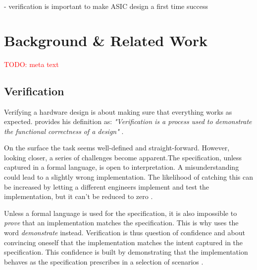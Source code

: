 \documentclass[11pt]{report}
\newcommand{\todo}[1]{\textcolor{red}{TODO: #1}}
\begin{document}
- verification is important to make ASIC design a first time success \cite[Ch. 3]{bergeron2012writing}

\chapter{Background \& Related Work} %

\todo{meta text}

\begin{comment}
- what is the purpose of verification
- what tools do we have to ease verification
- what tools do we have to measure verification progress
- don't introduce "things" but introduce the problems/challenges they're trying to solve

- in this section a complete picture of what verification includes should be drawn in order to put the foundation for
understanding what a verification framework should provide

- to understand current state of verification, we need to look at general approaches, the langauges and their
features, frameworks, as well as methodologies
\end{comment}


\section{Verification} %

Verifying a hardware design is about making sure that everything works as expected. \citeauthor{bergeron2012writing}
provides his definition as: \textit{"Verification is a process used to demonstrate the functional correctness of a
design"} \cite[Ch. 1]{bergeron2012writing}.

On the surface the task seems well-defined and straight-forward. However, looking closer, a series of challenges
become apparent.The specification, unless captured in a formal language, is open to interpretation. A
misunderstanding could lead to a slightly wrong implementation. The likelihood of catching this can be increased by
letting a different engineers implement and test the implementation, but it can't be reduced to zero \cite[Ch.
1]{bergeron2012writing}.

Unless a formal language is used for the specification, it is also impossible to \textit{prove} that an
implementation matches the specification. This is why \citeauthor{bergeron2012writing} uses the word
\textit{demonstrate} instead. Verification is thus question of confidence and about convincing oneself that the
implementation matches the intent captured in the specification. This confidence is built by demonstrating that the
implementation behaves as the specification prescribes in a selection of scenarios \cite[Ch. 1]{bergeron2012writing}.
\end{document}

